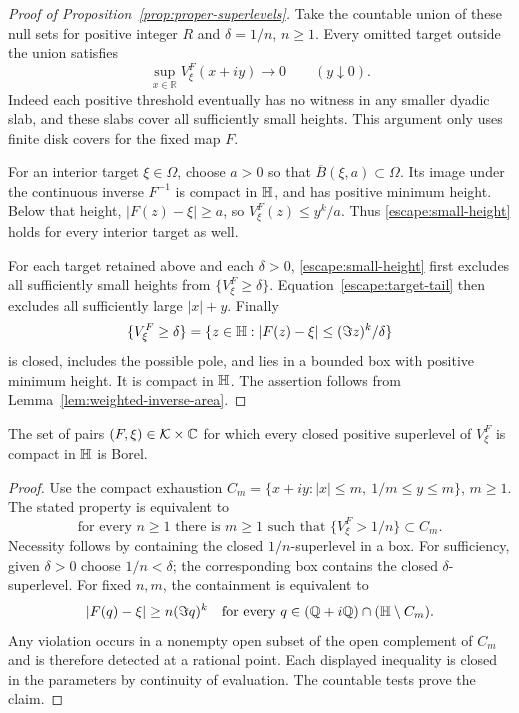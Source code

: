 \begin{proof}[Proof of Proposition~\ref{prop:proper-superlevels}]
Take the countable union of these null sets for positive integer $R$
and $\delta=1/n$, $n\ge1$.  Every omitted target outside the union
satisfies
\begin{equation}
 \sup_{x\in\mathbb R}V_\xi^F(x+iy)\longrightarrow0
                   \qquad(y\downarrow0).
 \label{escape:small-height}
\end{equation}
Indeed each positive threshold eventually has no witness in any smaller
dyadic slab, and these slabs cover all sufficiently small heights.
This argument only uses finite disk covers for the fixed map $F$.

For an interior target $\xi\in\Omega$, choose $a>0$ so that
$\overline B(\xi,a)\subset\Omega$.  Its image under the continuous
inverse $F^{-1}$ is compact in $\mathbb H$, and has positive minimum height.
Below that height, $|F(z)-\xi|\ge a$, so
$V_\xi^F(z)\le y^k/a$.  Thus \eqref{escape:small-height} holds for every
interior target as well.

For each target retained above and each $\delta>0$,
\eqref{escape:small-height} first excludes all sufficiently small
heights from $\{V_\xi^F\ge\delta\}$.
Equation~\eqref{escape:target-tail} then excludes all sufficiently
large $|x|+y$.  Finally
\[
 \{V_\xi^F\ge\delta\}
 =\{z\in\mathbb H:|F(z)-\xi|\le(\Im z)^k/\delta\}
\]
is closed, includes the possible pole, and lies in a bounded box with
positive minimum height.  It is compact in $\mathbb H$.  The assertion follows
from Lemma~\ref{lem:weighted-inverse-area}.
\end{proof}

\begin{lemma}
\label{lem:superlevel-borel}
The set of pairs $(F,\xi)\in\mathcal K\times\mathbb C$ for which every closed positive
superlevel of $V_\xi^F$ is compact in $\mathbb H$ is Borel.
\end{lemma}
\begin{proof}
Use the compact exhaustion
$C_m=\{x+iy:|x|\le m,\ 1/m\le y\le m\}$, $m\ge1$.
The stated property is equivalent to
\[
 \text{for every }n\ge1\text{ there is }m\ge1
       \text{ such that }\{V_\xi^F>1/n\}\subset C_m.
\]
Necessity follows by containing the closed $1/n$-superlevel in a box.
For sufficiency, given $\delta>0$ choose $1/n<\delta$; the corresponding
box contains the closed $\delta$-superlevel.
For fixed $n,m$, the containment is equivalent to
\[
 |F(q)-\xi|\ge n(\Im q)^k
 \quad\text{for every }q\in(\mathbb Q+i\mathbb Q)\cap(\mathbb H\setminus C_m).
\]
Any violation occurs in a nonempty open subset of the open complement
of $C_m$ and is therefore detected at a rational point.
Each displayed inequality is closed in the parameters by continuity
of evaluation.  The countable tests prove the claim.
\end{proof}
